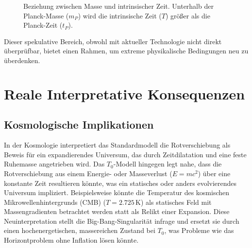 \documentclass[a4paper,12pt]{article}
\begin{document}
	\begin{figure}[h]
		\centering
		\caption{Beziehung zwischen Masse und intrinsischer Zeit. Unterhalb der Planck-Masse ($m_P$) wird die intrinsische Zeit ($T$) größer als die Planck-Zeit ($t_P$).}
	\end{figure}
	
	Dieser spekulative Bereich, obwohl mit aktueller Technologie nicht direkt überprüfbar, bietet einen Rahmen, um extreme physikalische Bedingungen neu zu überdenken.
	
	\section{Reale Interpretative Konsequenzen}
	
	\subsection{Kosmologische Implikationen}
	In der Kosmologie interpretiert das Standardmodell die Rotverschiebung als Beweis für ein expandierendes Universum, das durch Zeitdilatation und eine feste Ruhemasse angetrieben wird. Das \( T_0 \)-Modell hingegen legt nahe, dass die Rotverschiebung aus einem Energie- oder Masseverlust (\( E = m c^2 \)) über eine konstante Zeit resultieren könnte, was ein statisches oder anders evolvierendes Universum impliziert. Beispielsweise könnte die Temperatur des kosmischen Mikrowellenhintergrunds (CMB) (\( T = 2.725 \, \text{K} \)) als statisches Feld mit Massengradienten betrachtet werden statt als Relikt einer Expansion. Diese Neuinterpretation stellt die Big-Bang-Singularität infrage und ersetzt sie durch einen hochenergetischen, massereichen Zustand bei \( T_0 \), was Probleme wie das Horizontproblem ohne Inflation lösen könnte.
	
\end{document}
